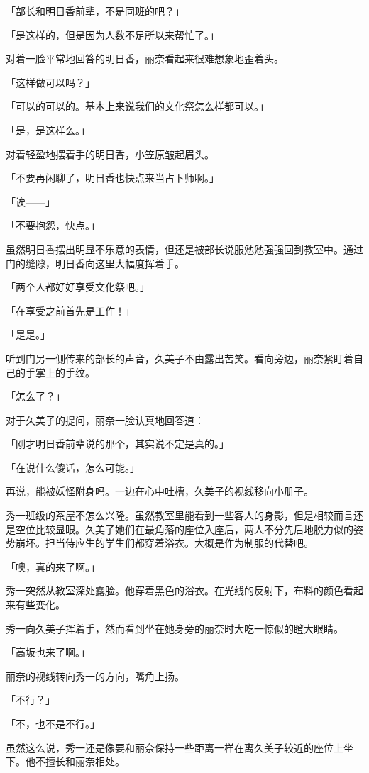 \documentclass[UTF8]{ctexart}
\begin{document}
    「部长和明日香前辈，不是同班的吧？」

    「是这样的，但是因为人数不足所以来帮忙了。」

    对着一脸平常地回答的明日香，丽奈看起来很难想象地歪着头。

    「这样做可以吗？」

    「可以的可以的。基本上来说我们的文化祭怎么样都可以。」

    「是，是这样么。」

    对着轻盈地摆着手的明日香，小笠原皱起眉头。

    「不要再闲聊了，明日香也快点来当占卜师啊。」

    「诶——」

    「不要抱怨，快点。」

    虽然明日香摆出明显不乐意的表情，但还是被部长说服勉勉强强回到教室中。通过门的缝隙，明日香向这里大幅度挥着手。

    「两个人都好好享受文化祭吧。」

    「在享受之前首先是工作！」

    「是是。」

    听到门另一侧传来的部长的声音，久美子不由露出苦笑。看向旁边，丽奈紧盯着自己的手掌上的手纹。

    「怎么了？」

    对于久美子的提问，丽奈一脸认真地回答道：

    「刚才明日香前辈说的那个，其实说不定是真的。」

    「在说什么傻话，怎么可能。」

    再说，能被妖怪附身吗。一边在心中吐槽，久美子的视线移向小册子。

    秀一班级的茶屋不怎么兴隆。虽然教室里能看到一些客人的身影，但是相较而言还是空位比较显眼。久美子她们在最角落的座位入座后，两人不分先后地脱力似的姿势崩坏。担当侍应生的学生们都穿着浴衣。大概是作为制服的代替吧。

    「噢，真的来了啊。」

    秀一突然从教室深处露脸。他穿着黑色的浴衣。在光线的反射下，布料的颜色看起来有些变化。

    秀一向久美子挥着手，然而看到坐在她身旁的丽奈时大吃一惊似的瞪大眼睛。

    「高坂也来了啊。」

    丽奈的视线转向秀一的方向，嘴角上扬。

    「不行？」

    「不，也不是不行。」

    虽然这么说，秀一还是像要和丽奈保持一些距离一样在离久美子较近的座位上坐下。他不擅长和丽奈相处。
\end{document}
